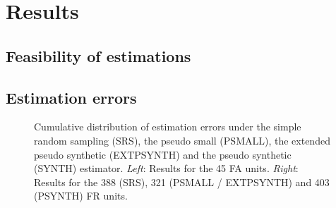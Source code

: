 \section{Results} %
\label{sec:Res}

\subsection{Feasibility of estimations}
\label{sec:feasest}








%
%








\newpage
\subsection{Estimation errors}
\label{sec:esterr}













\begin{figure}[H]
	\centering
	\caption{Cumulative distribution of estimation errors under the simple random sampling (SRS), the pseudo small (PSMALL), the extended pseudo synthetic (EXTPSYNTH) and the pseudo synthetic (SYNTH) estimator. \textit{Left}: Results for the 45 FA units. \textit{Right}: Results for the 388 (SRS), 321 (PSMALL / EXTPSYNTH) and 403 (PSYNTH) FR units.}
	\label{fig:disterrors}
\end{figure}



